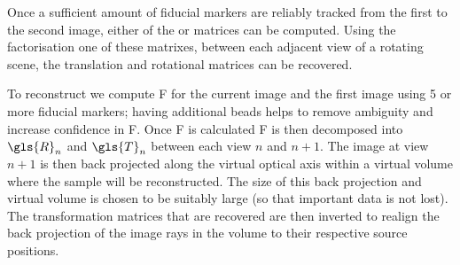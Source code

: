 \documentclass{osa-article}
\begin{document}

Once a sufficient amount of fiducial markers are reliably tracked from the first to the second image, either of the  or  matrices can be computed.
Using the factorisation one of these matrixes, between each adjacent view of a rotating scene, the translation and rotational matrices can be recovered.

To reconstruct we compute \gls{F} for the current image and the first image using 5 or more fiducial markers; having additional beads helps to remove ambiguity and increase confidence in \gls{F}.
Once \gls{F} is calculated \gls{F} is then decomposed into \(\gls{R}_n\) and \(\gls{T}_n\) between each view \(n\) and \(n+1\).
The image at view \(n+1\) is then back projected along the virtual optical axis within a virtual volume where the sample will be reconstructed.
The size of this back projection and virtual volume is chosen to be suitably large (so that important data is not lost).
The transformation matrices that are recovered are then inverted to realign the back projection of the image rays in the volume to their respective source positions.
\end{document}
